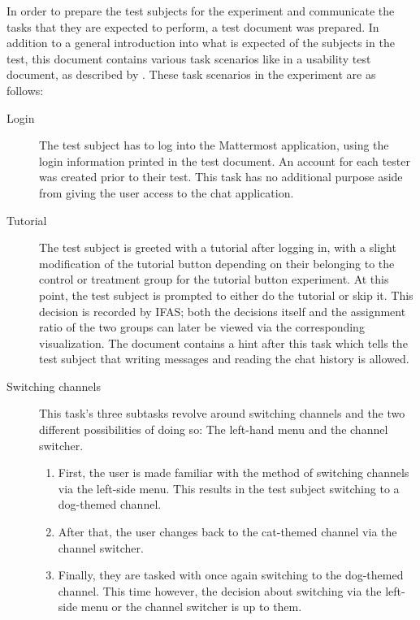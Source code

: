 In order to prepare the test subjects for the experiment and communicate the tasks that they are expected to perform, a test document was prepared.
In addition to a general introduction into what is expected of the subjects in the test, this document contains various task scenarios like in a usability test document, as described by \citet[Prepare Test Materials, pp.~182f]{rubin2008handbook}.
These task scenarios in the experiment are as follows:

\begin{description}

\item [Login] The test subject has to log into the Mattermost application, using the login information printed in the test document.
An account for each tester was created prior to their test.
This task has no additional purpose aside from giving the user access to the chat application.

\item [Tutorial] The test subject is greeted with a tutorial after logging in, with a slight modification of the tutorial button depending on their belonging to the control or treatment group for the tutorial button experiment.
At this point, the test subject is prompted to either do the tutorial or skip it.
This decision is recorded by \ac{IFAS}; both the decisions itself and the assignment ratio of the two groups can later be viewed via the corresponding visualization.
The document contains a hint after this task which tells the test subject that writing messages and reading the chat history is allowed.

\item [Switching channels] This task's three subtasks revolve around switching channels and the two different possibilities of doing so: The left-hand menu and the channel switcher.

\begin{enumerate}
\item First, the user is made familiar with the method of switching channels via the left-side menu.
This results in the test subject switching to a dog-themed channel.
\item After that, the user changes back to the cat-themed channel via the channel switcher.
\item Finally, they are tasked with once again switching to the dog-themed channel.
This time however, the decision about switching via the left-side menu or the channel switcher is up to them.
\end{enumerate}


\end{description}
